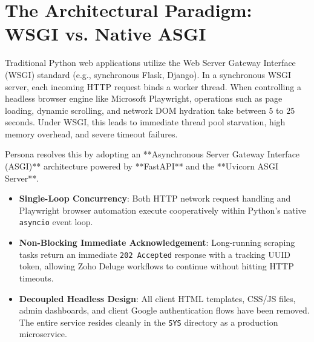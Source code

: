 \documentclass[11pt,a4paper]{report}
\begin{document}
\section{The Architectural Paradigm: WSGI vs. Native ASGI}
Traditional Python web applications utilize the Web Server Gateway Interface (WSGI) standard (e.g., synchronous Flask, Django). In a synchronous WSGI server, each incoming HTTP request binds a worker thread. When controlling a headless browser engine like Microsoft Playwright, operations such as page loading, dynamic scrolling, and network DOM hydration take between $5$ to $25$ seconds. Under WSGI, this leads to immediate thread pool starvation, high memory overhead, and severe timeout failures.

Persona resolves this by adopting an **Asynchronous Server Gateway Interface (ASGI)** architecture powered by **FastAPI** and the **Uvicorn ASGI Server**.
\begin{itemize}[leftmargin=*]
    \item \textbf{Single-Loop Concurrency}: Both HTTP network request handling and Playwright browser automation execute cooperatively within Python's native \texttt{asyncio} event loop.
    \item \textbf{Non-Blocking Immediate Acknowledgement}: Long-running scraping tasks return an immediate \texttt{202 Accepted} response with a tracking UUID token, allowing Zoho Deluge workflows to continue without hitting HTTP timeouts.
    \item \textbf{Decoupled Headless Design}: All client HTML templates, CSS/JS files, admin dashboards, and client Google authentication flows have been removed. The entire service resides cleanly in the \texttt{SYS} directory as a production microservice.
\end{itemize}
\end{document}
